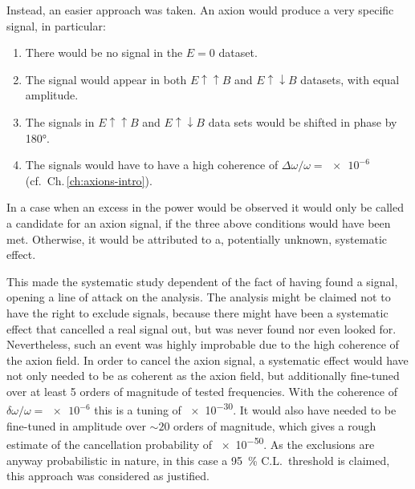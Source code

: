 Instead, an easier approach was taken. An axion would produce a very specific signal, in particular:
\begin{enumerate}
  \item There would be no signal in the $E=0$ dataset.
  \item The signal would appear in both $E \uparrow \uparrow B$ and $E \uparrow \downarrow B$ datasets, with equal amplitude.
  \item The signals in $E \uparrow \uparrow B$ and $E \uparrow \downarrow B$ data sets would be shifted in phase by \ang{180}.
  \item The signals would have to have a high coherence of $\Delta \omega / \omega = \num{e-6}$ (cf.\ Ch.\,\ref{ch:axions-intro}).
\end{enumerate}
In a case when an excess in the power would be observed it would only be called a candidate for an axion signal, if the three above conditions would have been met.
Otherwise, it would be attributed to a, potentially unknown, systematic effect.

This made the systematic study dependent of the fact of having found a signal, opening a line of attack on the analysis.
The analysis might be claimed not to have the right to exclude signals, because there might have been a systematic effect that cancelled a real signal out, but was never found nor even looked for.
Nevertheless, such an event was highly improbable due to the high coherence of the axion field.
In order to cancel the axion signal, a systematic effect would have not only needed to be as coherent as the axion field, but additionally fine-tuned over at least 5 orders of magnitude of tested frequencies.
With the coherence of $\delta \omega / \omega = \num{e-6}$ this is a tuning of \num{e-30}.
It would also have needed to be fine-tuned in amplitude over $\sim 20$ orders of magnitude, which gives a rough estimate of the cancellation probability of \num{e-50}.
As the exclusions are anyway probabilistic in nature, in this case a \SI{95}{\percent} C.L.\ threshold is claimed, this approach was considered as justified.




